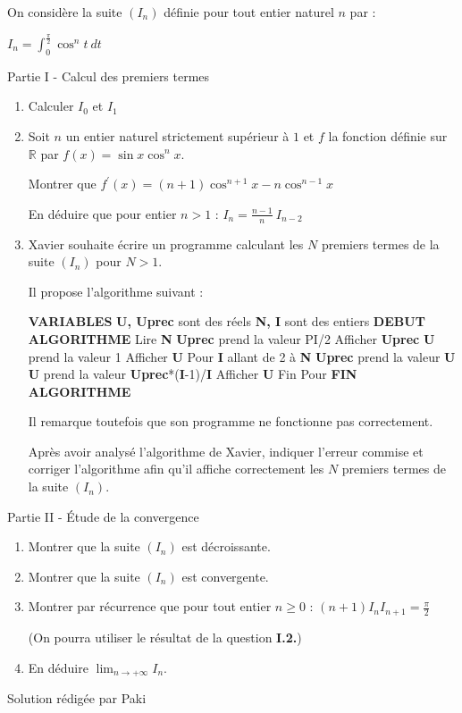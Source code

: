 
%
On considère la suite $(I_n)$ définie pour tout entier naturel $n$ par :
\par
$I_n= \int_0^{ \frac{ \pi } {2}}\cos^nt\ dt $
\begin{h3}Partie I - Calcul des premiers termes\end{h3}
\begin{enumerate}
     \item
     Calculer $I_0$ et $I_1$
     \item
     Soit $n$ un entier naturel strictement supérieur à $1$ et $f$ la fonction définie sur $\mathbb{R}$ par $f(x)=\sin x\cos^{n}x$.
     \par
     Montrer que $f^{\prime}(x)=(n+1)\cos^{n+1} x-n\cos^{n-1}x$
     \par
     En déduire que pour entier $n > 1$ : $I_n= \frac{n-1}{n}\ I_{n-2} $
     \item
     Xavier souhaite écrire un programme calculant les $N$ premiers termes de la suite $(I_n)$ pour $N > 1$.
     \par
     Il propose l'algorithme suivant :
\begin{code}
  \textbf{VARIABLES}
        \textbf{U, Uprec} sont des réels
        \textbf{N, I} sont des entiers
     \textbf{DEBUT ALGORITHME}
        Lire \textbf{N}
        \textbf{Uprec} prend la valeur PI/2
        Afficher \textbf{Uprec}
        \textbf{U} prend la valeur 1
        Afficher \textbf{U}
        Pour \textbf{I} allant de 2 à \textbf{N}
           \textbf{Uprec} prend la valeur \textbf{U}
           \textbf{U} prend la valeur \textbf{Uprec}*(\textbf{I}-1)/\textbf{I}
           Afficher \textbf{U}
        Fin Pour
     \textbf{FIN ALGORITHME}
\end{code}



Il remarque toutefois que son programme ne fonctionne pas correctement.
\par
Après avoir analysé l'algorithme de Xavier, indiquer l'erreur commise et corriger l'algorithme afin qu'il affiche correctement les $N$ premiers termes de la suite $(I_n)$.
\end{enumerate}
\begin{h3}Partie II - Étude de la convergence\end{h3}
\begin{enumerate}
     \item
     Montrer que la suite $(I_n)$ est décroissante.
     \item
     Montrer que la suite $(I_n)$ est convergente.
     \item
     Montrer par récurrence que pour tout entier $n  \geqslant 0$ : $\left(n+1\right)I_nI_{n+1}= \frac{ \pi }{2} $
     \par
     (On pourra utiliser le résultat de la question \textbf{I.2.})
     \item
     En déduire $ \lim_{n \rightarrow  +\infty  }  I_n$.
\end{enumerate}
\begin{corrige}
     Solution rédigée par Paki
     \par
     [pdf-embedder url="/wp-content/uploads/slides/integrales-de-wallis/integrales-de-wallis.pdf" width="676"]


\end{corrige}

